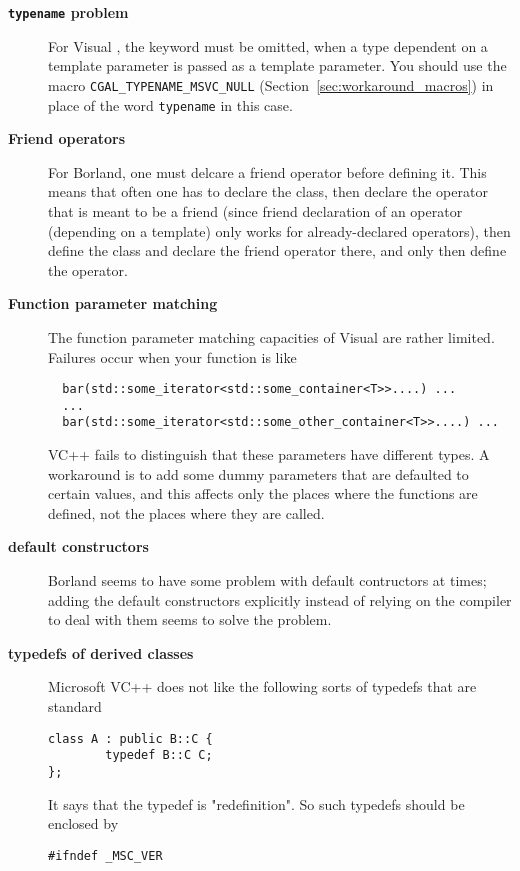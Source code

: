 \begin{description}
\item[\textbf{{\tt typename} problem}]
For Visual \CC, the keyword  must be omitted, when
a type dependent on a template parameter is passed as a template parameter. 
You should use the macro \texttt{CGAL\_TYPENAME\_MSVC\_NULL} 
(Section~\ref{sec:workaround_macros}) in place of the word \texttt{typename} 
in this case.

\item[\textbf{Friend operators}]

For Borland, one must delcare a friend operator before defining it.
This means that often one has to declare the class,
then declare the operator that is meant to be a friend
(since friend declaration of an operator (depending on a template) only 
works for already-declared operators),
then define the class and declare the friend operator there,
and only then define the operator.

\item[\textbf{Function parameter matching}]

The function parameter matching capacities of Visual \CC are rather limited. 
Failures occur when your function  is like
\begin{verbatim}
  bar(std::some_iterator<std::some_container<T>>....) ...
  ...
  bar(std::some_iterator<std::some_other_container<T>>....) ...
\end{verbatim}
VC++ fails to distinguish that these parameters have different types.
A workaround is to add some dummy parameters that are defaulted to
certain values, and this affects only the places where the functions
are defined, not the places where they are called.


%
\item[\textbf{default constructors}]

Borland seems to have some problem with default contructors at times;
adding the default constructors explicitly instead of relying on the
compiler to deal with them seems to solve the problem.

\item[\textbf{typedefs of derived classes}]
Microsoft VC++ does not like the following sorts of typedefs that are 
standard
\begin{verbatim}
class A : public B::C {
        typedef B::C C;
};
\end{verbatim}
It says that the typedef is "redefinition".  So such typedefs should be 
enclosed by
\begin{verbatim}
#ifndef _MSC_VER


\end{verbatim}
\end{description}
